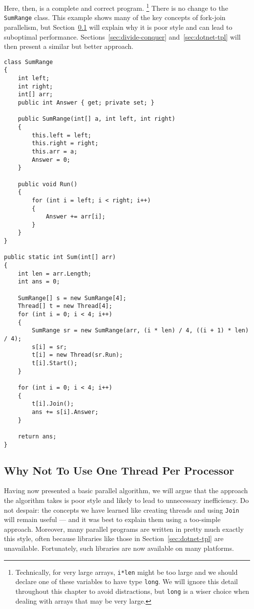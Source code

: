\documentclass[10pt]{article}
\begin{document}
Here, then, is a complete and correct program.  \footnote{Technically,
  for very large arrays, {\tt i*len} might be too large and we should
  declare one of these variables to have type {\tt long}.  We will
  ignore this detail throughout this chapter to avoid distractions,
  but {\tt long} is a wiser choice when dealing with arrays that may
  be very large.}  There is no change to
the {\tt SumRange} class.  This example shows many of the key
concepts of fork-join parallelism, but Section~\ref{sec:no-numprocs}
will explain why it is poor style and can lead to suboptimal
performance.  Sections~\ref{sec:divide-conquer} and~\ref{sec:dotnet-tpl}
will then present a similar but better approach.

\begin{verbatim}
class SumRange
{
    int left;
    int right;
    int[] arr;
    public int Answer { get; private set; }

    public SumRange(int[] a, int left, int right)
    {
        this.left = left;
        this.right = right;
        this.arr = a;
        Answer = 0;
    }

    public void Run()
    {
        for (int i = left; i < right; i++)
        {
            Answer += arr[i];
        }
    }
}

public static int Sum(int[] arr)
{
    int len = arr.Length;
    int ans = 0;

    SumRange[] s = new SumRange[4];
    Thread[] t = new Thread[4];
    for (int i = 0; i < 4; i++)
    {
        SumRange sr = new SumRange(arr, (i * len) / 4, ((i + 1) * len) / 4);
        s[i] = sr;
        t[i] = new Thread(sr.Run);
        t[i].Start();
    }

    for (int i = 0; i < 4; i++)
    {
        t[i].Join();
        ans += s[i].Answer;
    }

    return ans;
}
\end{verbatim}

\subsection{Why Not To Use One Thread Per Processor}
\label{sec:no-numprocs}

Having now presented a basic parallel algorithm, we will argue that
the approach the algorithm takes is poor style and likely to lead to
unnecessary inefficiency.  Do not despair: the concepts we have
learned like creating threads and using {\tt Join} will remain useful
--- and it was best to explain them using a too-simple approach.
Moreover, many parallel programs are written in pretty much exactly
this style, often because libraries like those in
Section~\ref{sec:dotnet-tpl} are unavailable.  Fortunately, such
libraries are now available on many platforms.
\end{document}
